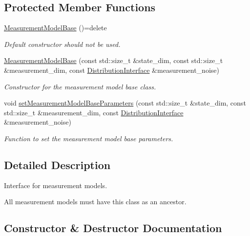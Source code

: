 \subsection*{Protected Member Functions}
\begin{DoxyCompactItemize}
\item 
\hyperlink{classrefill_1_1MeasurementModelBase_a908c61f87825591b8b0f061bb5a20453}{Measurement\+Model\+Base} ()=delete
\begin{DoxyCompactList}\small\item\em Default constructor should not be used. \end{DoxyCompactList}\item 
\hyperlink{classrefill_1_1MeasurementModelBase_aecd0e5adaf05179b8fdb49c1dbb7c049}{Measurement\+Model\+Base} (const std\+::size\+\_\+t \&state\+\_\+dim, const std\+::size\+\_\+t \&measurement\+\_\+dim, const \hyperlink{classrefill_1_1DistributionInterface}{Distribution\+Interface} \&measurement\+\_\+noise)
\begin{DoxyCompactList}\small\item\em Constructor for the measurement model base class. \end{DoxyCompactList}\item 
void \hyperlink{classrefill_1_1MeasurementModelBase_aa9d94ffba2c1347dfe342865670d0185}{set\+Measurement\+Model\+Base\+Parameters} (const std\+::size\+\_\+t \&state\+\_\+dim, const std\+::size\+\_\+t \&measurement\+\_\+dim, const \hyperlink{classrefill_1_1DistributionInterface}{Distribution\+Interface} \&measurement\+\_\+noise)
\begin{DoxyCompactList}\small\item\em Function to set the measurement model base parameters. \end{DoxyCompactList}\end{DoxyCompactItemize}


\subsection{Detailed Description}
Interface for measurement models. 

All measurement models must have this class as an ancestor. 

\subsection{Constructor \& Destructor Documentation}
